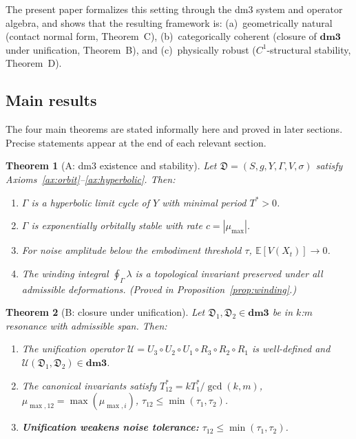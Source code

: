 \documentclass[12pt, oneside]{book}
\theoremstyle{plain}
\newtheorem{theorem}{Theorem}[section]
\theoremstyle{definition}
\theoremstyle{remark}
\newcommand{\dm}{\mathfrak{D}}
\newcommand{\dmcat}{\mathbf{dm3}}
\newcommand{\Orb}{\Gamma}
\newcommand{\cU}{\mathcal{U}}
\newcommand{\abs}[1]{\left|#1\right|}
\begin{document}
The present paper formalizes this setting through the dm3 system and
operator algebra, and shows that the resulting framework is: (a)~geometrically
natural (contact normal form, Theorem~C), (b)~categorically coherent
(closure of $\dmcat$ under unification, Theorem~B), and (c)~physically
robust ($C^1$-structural stability, Theorem~D).

\subsection{Main results}

The four main theorems are stated informally here and proved in later
sections. Precise statements appear at the end of each relevant section.

\begin{theorem}[A: dm3 existence and stability]\label{thm:A}
Let $\dm=(S,g,Y,\Orb,V,\sigma)$ satisfy
Axioms~\ref{ax:orbit}--\ref{ax:hyperbolic}. Then:
\begin{enumerate}[label=\textup{(\roman*)}]
  \item $\Orb$ is a hyperbolic limit cycle of $Y$ with minimal period $T^*>0$.
  \item $\Orb$ is exponentially orbitally stable with rate $c=\abs{\mu_{\max}}$.
  \item For noise amplitude below the embodiment threshold $\tau$,
        $\mathbb{E}[V(X_t)]\to 0$.
  \item The winding integral $\oint_{\Orb}\lambda$ is a topological invariant
        preserved under all admissible deformations.
        \textup{(Proved in Proposition~\ref{prop:winding}.)}
\end{enumerate}
\end{theorem}

\begin{theorem}[B: closure under unification]\label{thm:B}
Let $\dm_1,\dm_2\in\dmcat$ be in $k$:$m$ resonance with admissible span.
Then:
\begin{enumerate}[label=\textup{(\roman*)}]
  \item The unification operator $\cU=U_3\circ U_2\circ U_1\circ R_3\circ R_2\circ R_1$
        is well-defined and $\cU(\dm_1,\dm_2)\in\dmcat$.
  \item The canonical invariants satisfy
        $T^*_{12}=kT^*_1/\gcd(k,m)$,\;
        $\mu_{\max,12}=\max(\mu_{\max,i})$,\;
        $\tau_{12}\le\min(\tau_1,\tau_2)$.
  \item \textbf{Unification weakens noise tolerance:}
        $\tau_{12}\le\min(\tau_1,\tau_2)$.
\end{enumerate}
\end{theorem}
\end{document}
